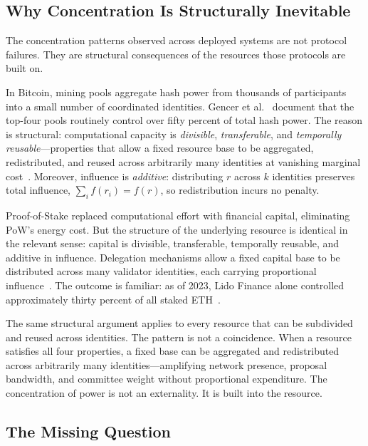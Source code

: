 \documentclass[10pt,journal,compsoc]{IEEEtran}
\theoremstyle{remark}
\begin{document}
	\subsection{Why Concentration Is Structurally Inevitable}
	\label{ssec:concentration}
	
	The concentration patterns observed across deployed systems
	are not protocol failures.
	They are structural consequences of the resources those
	protocols are built on.
	
	In Bitcoin, mining pools aggregate hash power from thousands
	of participants into a small number of coordinated identities.
	Gencer et al.~\cite{gencer2018decentralization} document
	that the top-four pools routinely control over fifty percent
	of total hash power.
	The reason is structural: computational capacity is
	\emph{divisible}, \emph{transferable}, and \emph{temporally
		reusable}---properties that allow a fixed resource base to
	be aggregated, redistributed, and reused across arbitrarily
	many identities at vanishing marginal
	cost~\cite{rosenfeld2011analysis,bonneau2015sok}.
	Moreover, influence is \emph{additive}: distributing $r$
	across $k$ identities preserves total influence,
	$\sum_{i} f(r_i) = f(r)$, so redistribution incurs no
	penalty.
	
	Proof-of-Stake replaced computational effort with
	financial capital, eliminating PoW's energy cost.
	But the structure of the underlying resource is
	identical in the relevant sense: capital is divisible,
	transferable, temporally reusable, and additive in influence.
	Delegation mechanisms allow a fixed capital base to be
	distributed across many validator identities, each carrying
	proportional influence~\cite{kiayias2017ouroboros,saleh2021blockchain}.
	The outcome is familiar: as of 2023, Lido Finance alone
	controlled approximately thirty percent of all staked
	ETH~\cite{lido2023concentration}.
	
	The same structural argument applies to every resource
	that can be subdivided and reused across identities.
	The pattern is not a coincidence.
	When a resource satisfies all four properties, a fixed
	base can be aggregated and redistributed across arbitrarily
	many identities---amplifying network presence, proposal
	bandwidth, and committee weight without proportional
	expenditure.
	The concentration of power is not an externality.
	It is built into the resource.
	
	\subsection{The Missing Question}
	\label{ssec:missing}
	
\end{document}
